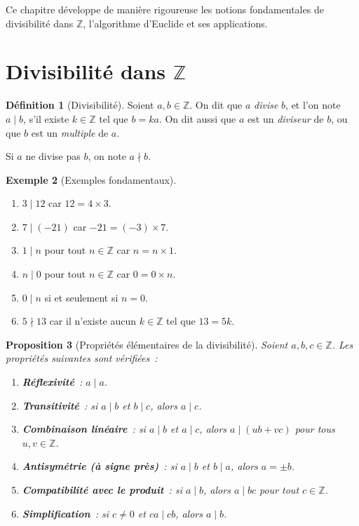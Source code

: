 \documentclass[12pt,a4paper,openany]{book}
\theoremstyle{definition}
\newtheorem{definition}{Définition}[chapter]
\newtheorem{exemple}[definition]{Exemple}
\theoremstyle{plain}
\newtheorem{proposition}[definition]{Proposition}
\theoremstyle{remark}
\newcommand{\Z}{\mathbb{Z}}
\begin{document}
Ce chapitre développe de manière rigoureuse les notions fondamentales de divisibilité
dans $\Z$, l'algorithme d'Euclide et ses applications.

\section{Divisibilité dans $\Z$}
\label{sec:ch1:divisibilite}


\begin{definition}[Divisibilité]
\label{def:divisibilite}
Soient $a, b \in \Z$. On dit que $a$ \emph{divise} $b$, et l'on note $a \mid b$,
s'il existe $k \in \Z$ tel que $b = ka$. On dit aussi que $a$ est un
\emph{diviseur} de $b$, ou que $b$ est un
\emph{multiple} de $a$.

Si $a$ ne divise pas $b$, on note $a \nmid b$.
\end{definition}

\begin{exemple}[Exemples fondamentaux]
\label{ex:div:fondamentaux}
\begin{enumerate}[label=(\roman*)]
  \item $3 \mid 12$ car $12 = 4 \times 3$.
  \item $7 \mid (-21)$ car $-21 = (-3) \times 7$.
  \item $1 \mid n$ pour tout $n \in \Z$ car $n = n \times 1$.
  \item $n \mid 0$ pour tout $n \in \Z$ car $0 = 0 \times n$.
  \item $0 \mid n$ si et seulement si $n = 0$.
  \item $5 \nmid 13$ car il n'existe aucun $k \in \Z$ tel que $13 = 5k$.
\end{enumerate}
\end{exemple}

\begin{proposition}[Propriétés élémentaires de la divisibilité]
\label{prop:div:elem}
Soient $a, b, c \in \Z$. Les propriétés suivantes sont vérifiées~:
\begin{enumerate}[label=(\roman*)]
  \item \textbf{Réflexivité}~: $a \mid a$.
  \item \textbf{Transitivité}~: si $a \mid b$ et $b \mid c$, alors $a \mid c$.
  \item \textbf{Combinaison linéaire}~: si $a \mid b$ et $a \mid c$, alors
    $a \mid (ub + vc)$ pour tous $u, v \in \Z$.
  \item \textbf{Antisymétrie (à signe près)}~: si $a \mid b$ et $b \mid a$, alors
    $a = \pm b$.
  \item \textbf{Compatibilité avec le produit}~: si $a \mid b$, alors $a \mid bc$
    pour tout $c \in \Z$.
  \item \textbf{Simplification}~: si $c \neq 0$ et $ca \mid cb$, alors $a \mid b$.
\end{enumerate}
\end{proposition}
\end{document}
